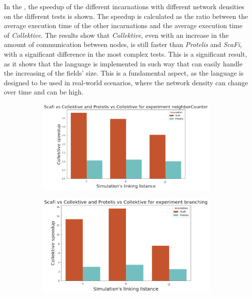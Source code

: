 In the , the speedup of the different incarnations with different network densities on the different tests is shown.
The speedup is calculated as the ratio between the average execution time of the other incarnations and the average execution time of
\emph{Collektive}.
The results show that \emph{Collektive}, even with an increase in the amount of communication between nodes, is still
faster than \emph{Protelis} and \emph{ScaFi}, with a significant difference in the most complex tests.
This is a significant result, as it shows that the language is implemented in such way that can easily handle the increasing
of the fields' size.
This is a fundamental aspect, as the language is designed to be used in real-world scenarios, where the network density
can change over time and can be high.

\begin{figure}[ht!]
    \centering
    \begin{subfigure}[b]{0.49\textwidth}
        \centering
        \includegraphics[width=\textwidth]{figures/neighbor-speedup}
    \end{subfigure}
    \begin{subfigure}[b]{0.49\textwidth}
        \centering
        \includegraphics[width=\textwidth]{figures/branching-speedup}

\end{subfigure}
\end{figure}
